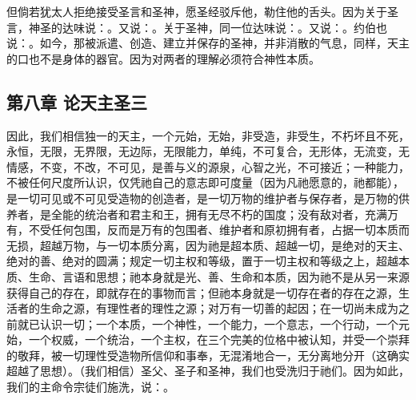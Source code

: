 但倘若犹太人拒绝接受圣言和圣神，愿圣经驳斥他，勒住他的舌头。因为关于圣言，神圣的达味说：。又说：。关于圣神，同一位达味说：。又说：。约伯也说：。如今，那被派遣、创造、建立并保存的圣神，并非消散的气息，同样，天主的口也不是身体的器官。因为对两者的理解必须符合神性本质。\par


\subsection{第八章 论天主圣三}

因此，我们相信独一的天主，一个元始，无始，非受造，非受生，不朽坏且不死，永恒，无限，无界限，无边际，无限能力，单纯，不可复合，无形体，无流变，无情感，不变，不改，不可见，是善与义的源泉，心智之光，不可接近；一种能力，不被任何尺度所认识，仅凭祂自己的意志即可度量（因为凡祂愿意的，祂都能），是一切可见或不可见受造物的创造者，是一切万物的维护者与保存者，是万物的供养者，是全能的统治者和君主和王，拥有无尽不朽的国度；没有敌对者，充满万有，不受任何包围，反而是万有的包围者、维护者和原初拥有者，占据一切本质而无损，超越万物，与一切本质分离，因为祂是超本质、超越一切，是绝对的天主、绝对的善、绝对的圆满；规定一切主权和等级，置于一切主权和等级之上，超越本质、生命、言语和思想；祂本身就是光、善、生命和本质，因为祂不是从另一来源获得自己的存在，即就存在的事物而言；但祂本身就是一切存在者的存在之源，生活者的生命之源，有理性者的理性之源；对万有一切善的起因；在一切尚未成为之前就已认识一切；一个本质，一个神性，一个能力，一个意志，一个行动，一个元始，一个权威，一个统治，一个主权，在三个完美的位格中被认知，并受一个崇拜的敬拜，被一切理性受造物所信仰和事奉，无混淆地合一，无分离地分开（这确实超越了思想）。（我们相信）圣父、圣子和圣神，我们也受洗归于祂们。因为如此，我们的主命令宗徒们施洗，说：。\par

